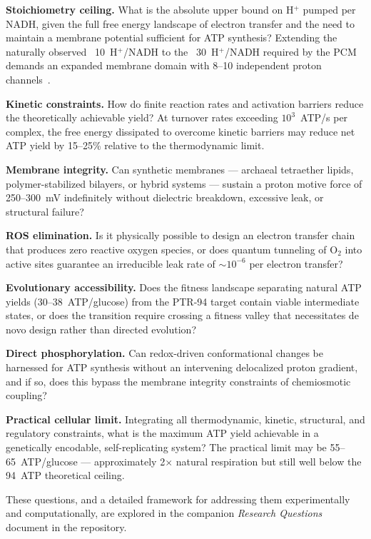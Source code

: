\documentclass[12pt]{article}
\begin{document}
\textbf{Stoichiometry ceiling.} What is the absolute upper bound on H$^+$ pumped per NADH, given the full free energy landscape of electron transfer and the need to maintain a membrane potential sufficient for ATP synthesis? Extending the naturally observed ~10~H$^+$/NADH to the ~30~H$^+$/NADH required by the PCM demands an expanded membrane domain with 8--10 independent proton channels~\cite{sazanov2015complex}.

\textbf{Kinetic constraints.} How do finite reaction rates and activation barriers reduce the theoretically achievable yield? At turnover rates exceeding $10^3$~ATP/s per complex, the free energy dissipated to overcome kinetic barriers may reduce net ATP yield by 15--25\% relative to the thermodynamic limit.

\textbf{Membrane integrity.} Can synthetic membranes — archaeal tetraether lipids, polymer-stabilized bilayers, or hybrid systems — sustain a proton motive force of 250--300~mV indefinitely without dielectric breakdown, excessive leak, or structural failure?

\textbf{ROS elimination.} Is it physically possible to design an electron transfer chain that produces zero reactive oxygen species, or does quantum tunneling of O$_2$ into active sites guarantee an irreducible leak rate of $\sim10^{-6}$ per electron transfer?

\textbf{Evolutionary accessibility.} Does the fitness landscape separating natural ATP yields (30--38~ATP/glucose) from the PTR-94 target contain viable intermediate states, or does the transition require crossing a fitness valley that necessitates de novo design rather than directed evolution?

\textbf{Direct phosphorylation.} Can redox-driven conformational changes be harnessed for ATP synthesis without an intervening delocalized proton gradient, and if so, does this bypass the membrane integrity constraints of chemiosmotic coupling?

\textbf{Practical cellular limit.} Integrating all thermodynamic, kinetic, structural, and regulatory constraints, what is the maximum ATP yield achievable in a genetically encodable, self-replicating system? The practical limit may be 55--65~ATP/glucose — approximately 2$\times$ natural respiration but still well below the 94~ATP theoretical ceiling.

These questions, and a detailed framework for addressing them experimentally and computationally, are explored in the companion \textit{Research Questions} document in the repository.
\end{document}
